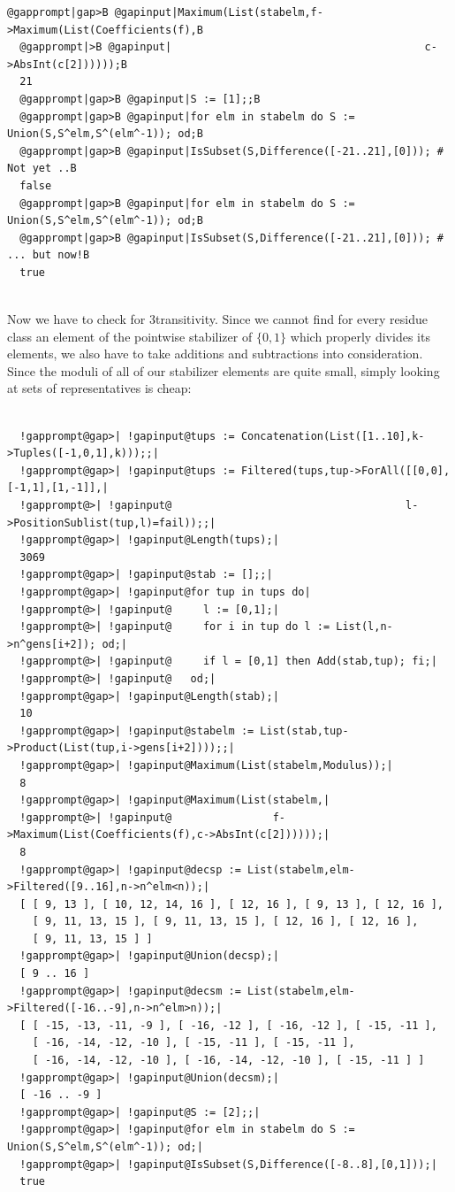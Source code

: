 \documentclass[a4paper,11pt]{report}
\begin{document}
{{\begin{Verbatim}[commandchars=@|B,fontsize=\small,frame=single,label=Example]
  @gapprompt|gap>B @gapinput|Maximum(List(stabelm,f->Maximum(List(Coefficients(f),B
  @gapprompt|>B @gapinput|                                        c->AbsInt(c[2])))));B
  21
  @gapprompt|gap>B @gapinput|S := [1];;B
  @gapprompt|gap>B @gapinput|for elm in stabelm do S := Union(S,S^elm,S^(elm^-1)); od;B
  @gapprompt|gap>B @gapinput|IsSubset(S,Difference([-21..21],[0])); # Not yet ..B
  false
  @gapprompt|gap>B @gapinput|for elm in stabelm do S := Union(S,S^elm,S^(elm^-1)); od;B
  @gapprompt|gap>B @gapinput|IsSubset(S,Difference([-21..21],[0])); # ... but now!B
  true
  
\end{Verbatim}
 Now we have to check for 3\texttt{}transitivity. Since we cannot
find for every residue class an element of the pointwise stabilizer of $\{0,1\}$ which properly divides its elements, we also have to take additions and
subtractions into consideration. Since the moduli of all of our stabilizer
elements are quite small, simply looking at sets of representatives is cheap: 
\begin{Verbatim}[commandchars=!@|,fontsize=\small,frame=single,label=Example]
  
  !gapprompt@gap>| !gapinput@tups := Concatenation(List([1..10],k->Tuples([-1,0,1],k)));;|
  !gapprompt@gap>| !gapinput@tups := Filtered(tups,tup->ForAll([[0,0],[-1,1],[1,-1]],|
  !gapprompt@>| !gapinput@                                     l->PositionSublist(tup,l)=fail));;|
  !gapprompt@gap>| !gapinput@Length(tups);|
  3069
  !gapprompt@gap>| !gapinput@stab := [];;|
  !gapprompt@gap>| !gapinput@for tup in tups do|
  !gapprompt@>| !gapinput@     l := [0,1];|
  !gapprompt@>| !gapinput@     for i in tup do l := List(l,n->n^gens[i+2]); od;|
  !gapprompt@>| !gapinput@     if l = [0,1] then Add(stab,tup); fi;|
  !gapprompt@>| !gapinput@   od;|
  !gapprompt@gap>| !gapinput@Length(stab);|
  10
  !gapprompt@gap>| !gapinput@stabelm := List(stab,tup->Product(List(tup,i->gens[i+2])));;|
  !gapprompt@gap>| !gapinput@Maximum(List(stabelm,Modulus));|
  8
  !gapprompt@gap>| !gapinput@Maximum(List(stabelm,|
  !gapprompt@>| !gapinput@                f->Maximum(List(Coefficients(f),c->AbsInt(c[2])))));|
  8
  !gapprompt@gap>| !gapinput@decsp := List(stabelm,elm->Filtered([9..16],n->n^elm<n));|
  [ [ 9, 13 ], [ 10, 12, 14, 16 ], [ 12, 16 ], [ 9, 13 ], [ 12, 16 ], 
    [ 9, 11, 13, 15 ], [ 9, 11, 13, 15 ], [ 12, 16 ], [ 12, 16 ], 
    [ 9, 11, 13, 15 ] ]
  !gapprompt@gap>| !gapinput@Union(decsp);|
  [ 9 .. 16 ]
  !gapprompt@gap>| !gapinput@decsm := List(stabelm,elm->Filtered([-16..-9],n->n^elm>n));|
  [ [ -15, -13, -11, -9 ], [ -16, -12 ], [ -16, -12 ], [ -15, -11 ], 
    [ -16, -14, -12, -10 ], [ -15, -11 ], [ -15, -11 ], 
    [ -16, -14, -12, -10 ], [ -16, -14, -12, -10 ], [ -15, -11 ] ]
  !gapprompt@gap>| !gapinput@Union(decsm);|
  [ -16 .. -9 ]
  !gapprompt@gap>| !gapinput@S := [2];;|
  !gapprompt@gap>| !gapinput@for elm in stabelm do S := Union(S,S^elm,S^(elm^-1)); od;|
  !gapprompt@gap>| !gapinput@IsSubset(S,Difference([-8..8],[0,1]));|
  true
  

\end{Verbatim}}}
\end{document}
